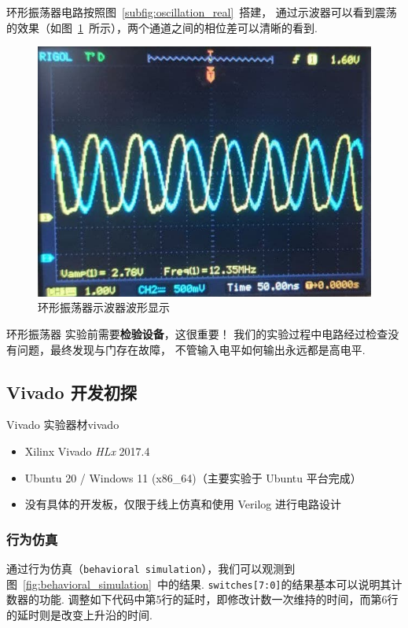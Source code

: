 \documentclass[11pt]{SEU-Digital-Report}
\begin{document}
            环形振荡器电路按照图~\ref{subfig:oscillation_real}~搭建，
            通过示波器可以看到震荡的效果（如图~\ref{fig:two_waves}~所示），两个通道之间的相位差可以清晰的看到.

            \begin{figure}[htbp]
                \centering
                \includegraphics[width=.4\linewidth]{fig/two_waves.jpg}
                \caption{环形振荡器示波器波形显示}
                \label{fig:two_waves}
            \end{figure}

            \begin{note}{环形振荡器}{}
                实验前需要\textbf{检验设备}，这很重要！
                我们的实验过程中电路经过检查没有问题，最终发现与门存在故障，
                不管输入电平如何输出永远都是高电平.
            \end{note}

        \subsection{Vivado 开发初探}

            \begin{device}{Vivado 实验器材}{vivado}
                \begin{itemize}
                    \item Xilinx Vivado \textit{HLx} 2017.4
                    \item Ubuntu 20 / Windows 11 (x86\_64){\kaishu\color{gray}（主要实验于 Ubuntu 平台完成）}
                    \item 没有具体的开发板，仅限于线上仿真和使用 Verilog 进行电路设计
                \end{itemize}
            \end{device}

            \subsubsection{行为仿真}

                通过行为仿真（\texttt{behavioral simulation}），我们可以观测到图~\ref{fig:behavioral_simulation}~中的结果.
                \texttt{switches[7:0]}的结果基本可以说明其计数器的功能.
                调整如下代码中第5行的延时，即修改计数一次维持的时间，而第6行的延时则是改变上升沿的时间.
\end{document}
